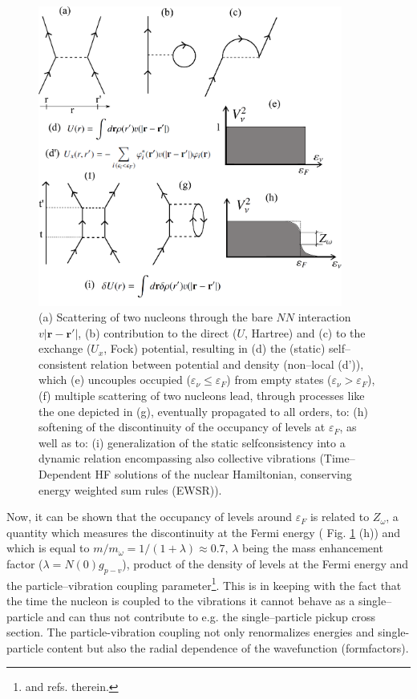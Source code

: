  \begin{figure}
\centerline{\includegraphics*[width=10cm,angle=0]{C6/figs_C6/fig6_A1}}
\caption{(a)  Scattering of two nucleons through the bare $NN$ interaction \mbox{$v|\mathbf{r}-\mathbf{r}'|$}, (b) contribution to the direct ($U$, Hartree) and (c) to the exchange ($U_x$, Fock) potential, resulting in (d) the (static) self--consistent relation between potential and density (non--local (d')), which (e) uncouples occupied ($\varepsilon_\nu\leq\varepsilon_F$) from empty states ($\varepsilon_\nu>\varepsilon_F$), (f) multiple scattering of two nucleons lead, through processes like the one depicted in (g), eventually propagated to all orders, to: (h) softening of the discontinuity of the occupancy of levels at $\varepsilon_F$, as well as to: (i) generalization of the static selfconsistency into a dynamic relation encompassing also collective vibrations (Time--Dependent HF solutions of the nuclear Hamiltonian, conserving energy weighted sum rules (EWSR)).}\label{fig6_A1}
\end{figure}

Now, it can be shown that the occupancy of levels around $\varepsilon_F$ is related to $Z_\omega$, a quantity which measures the discontinuity at the Fermi energy ( Fig. \ref{fig6_A1} (h)) and which is equal to $m/m_\omega=1/(1+\lambda)\approx 0.7,\, \lambda$ being the mass enhancement factor ($\lambda=N(0)g_{p-v}$), product of the density of levels at the Fermi energy and the particle--vibration coupling parameter\footnote{\cite{Barranco:05,Brink:05} and refs. therein.}. This is in keeping with the fact that the time the nucleon is coupled to the vibrations it cannot behave as a single--particle and can thus not contribute to e.g. the single--particle pickup cross section. The particle-vibration coupling not only renormalizes energies and single-particle content but also the radial dependence of the wavefunction
 (formfactors).

















